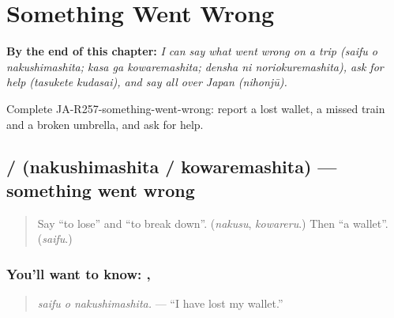 
\chapter{Something Went Wrong}
\label{ch:ja-something-went-wrong}

\begin{chapteropening}
\textbf{By the end of this chapter:} \emph{I can say what went wrong on a trip (saifu o nakushimashita; kasa ga kowaremashita; densha ni noriokuremashita), ask for help (tasukete kudasai), and say all over Japan (nihonjū).}

Complete JA-R257-something-went-wrong: report a lost wallet, a missed train and a broken umbrella, and ask for help.
\end{chapteropening}

\section[\texorpdfstring{\ja{なくしました} … (nakushimashita …)}{なくしました … (nakushimashita …)}]{ /  (nakushimashita / kowaremashita) — something went wrong}

\label{lesson:JA-C257-nakushimashita}



\begin{quote}
Say \textquotedblleft{}to lose\textquotedblright{} and \textquotedblleft{}to break down\textquotedblright{}. (\emph{nakusu}, \emph{kowareru}.) Then \textquotedblleft{}a wallet\textquotedblright{}. (\emph{saifu}.)
\end{quote}

\subsection*{You'll want to know:  ,  }
\begin{quote}
\textbf{ }
\end{quote}

\begin{quote}
\emph{saifu o nakushimashita.} — \textquotedblleft{}I have lost my wallet.\textquotedblright{}
\end{quote}

